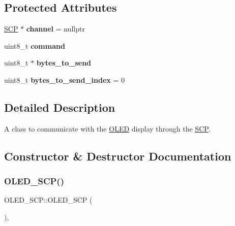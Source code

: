 \subsection*{Protected Attributes}
\begin{DoxyCompactItemize}
\item 
\hypertarget{class_o_l_e_d___s_c_p_aeffe5e3de0c2fd0345c5059334b93b64}{}\label{class_o_l_e_d___s_c_p_aeffe5e3de0c2fd0345c5059334b93b64} 
\hyperlink{class_s_c_p}{S\+CP} $\ast$ {\bfseries channel} = nullptr
\item 
\hypertarget{class_o_l_e_d___s_c_p_ac3bd64cdb125ee088a59834635c038a3}{}\label{class_o_l_e_d___s_c_p_ac3bd64cdb125ee088a59834635c038a3} 
uint8\+\_\+t {\bfseries command}
\item 
\hypertarget{class_o_l_e_d___s_c_p_afa645cae97534763fa5e44f79cb7e03f}{}\label{class_o_l_e_d___s_c_p_afa645cae97534763fa5e44f79cb7e03f} 
uint8\+\_\+t $\ast$ {\bfseries bytes\+\_\+to\+\_\+send}
\item 
\hypertarget{class_o_l_e_d___s_c_p_adf0fee62e45244241a53c5b5232f4e5e}{}\label{class_o_l_e_d___s_c_p_adf0fee62e45244241a53c5b5232f4e5e} 
uint8\+\_\+t {\bfseries bytes\+\_\+to\+\_\+send\+\_\+index} = 0
\end{DoxyCompactItemize}


\subsection{Detailed Description}
A class to communicate with the \hyperlink{class_o_l_e_d}{O\+L\+ED} display through the \hyperlink{class_s_c_p}{S\+CP}. 

\subsection{Constructor \& Destructor Documentation}
\hypertarget{class_o_l_e_d___s_c_p_a8a52dd583b6f4bdf479204c31c99b4b7}{}\label{class_o_l_e_d___s_c_p_a8a52dd583b6f4bdf479204c31c99b4b7} 
\subsubsection{\texorpdfstring{O\+L\+E\+D\+\_\+\+S\+C\+P()}{OLED\_SCP()}}
{\footnotesize\ttfamily O\+L\+E\+D\+\_\+\+S\+C\+P\+::\+O\+L\+E\+D\+\_\+\+S\+CP (\begin{DoxyParamCaption}{ }\end{DoxyParamCaption})\hspace{0.3cm}{\ttfamily [inline]}, {\ttfamily [protected]}}

